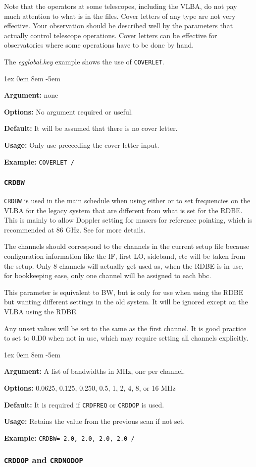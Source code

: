 \documentclass{report}
\newcommand{\rcwbox}[5]{
  \begin{list}{}{\parsep 1ex  \itemsep 0em
                 \leftmargin 8em  \itemindent -5em }
    \item {\bf Argument:} #1
    \item {\bf Options:}  #2
    \item {\bf Default:}  #3
    \item {\bf Usage:}    #4
    \item {\bf Example:}  #5
  \end{list}
}
\begin{document}
Note that the operators at some telescopes, including the VLBA, do
not pay much attention to what is in the files.  Cover letters
of any type are not very effective.  Your observation should be
described well by the parameters that actually control telescope
operations.  Cover letters can be effective for observatories where
some operations have to be done by hand.

The {\sl egglobal.key} example shows the use of {\tt COVERLET}.

\rcwbox
{none}
{No argument required or useful.}
{It will be assumed that there is no cover letter.}
{Only use preceeding the cover letter input.}
{{\tt COVERLET /}}


\subsubsection{\label{MP:CRDBW}{\tt CRDBW}}

{\tt CRDBW} is used in the main schedule when using either 
 or 
to set frequencies on the VLBA for the legacy system that are 
different from what is set for the RDBE.  This is mainly to allow
Doppler setting for masers for reference pointing, which is recommended
at 86 GHz.  See  for more
details.

The channels should correspond to the channels in the current setup
file because configuration information like the IF, first LO, sideband,
etc will be taken from the setup.  Only 8 channels will actually get
used as, when the RDBE is in use, for bookkeeping ease, only one channel
will be assigned to each bbc.

This parameter is equivalent to BW, but is only for use when using the
RDBE but wanting different settings in the old system.  It will be
ignored except on the VLBA using the RDBE.

Any unset values will be set to the same as the first channel.  It is
good practice to set to 0.D0 when not in use, which may require setting
all channels explicitly.

\rcwbox
{A list of bandwidths in MHz, one per channel.}
{0.0625, 0.125, 0.250, 0.5, 1, 2, 4, 8, or 16 MHz}
{It is required if {\tt CRDFREQ} or {\tt CRDDOP} is used.}
{Retains the value from the previous scan if not set.}
{{\tt CRDBW= 2.0, 2.0, 2.0, 2.0 /}}

\subsubsection{\label{MP:CRDDOP}{{\tt CRDDOP} and {\tt CRDNODOP}}}
\end{document}
